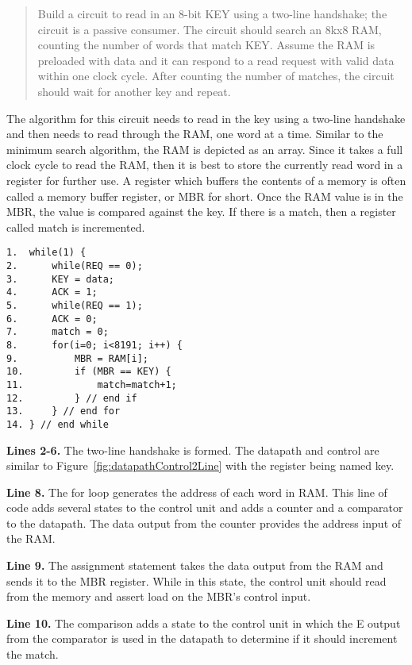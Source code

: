 \begin{quote}
Build a circuit to read in an 8-bit KEY using a 
two-line handshake; the circuit is a passive consumer.
The circuit should search an 8kx8 RAM, counting the number
of words that match KEY.  Assume the RAM is
preloaded with data and it can respond to a read
request with valid data within one clock cycle.  After 
counting the number of matches, the circuit should wait 
for another key and repeat.
\end{quote}

The algorithm for this circuit needs to read in the key using
a two-line handshake and then needs to read through the RAM, one word
at a time.  Similar to the minimum search algorithm, the
RAM is depicted as an array.  Since it takes a full 
clock cycle to read the
RAM, then it is best to store the currently read word in a 
register for further use.  A register which buffers the contents
of a memory is often called a memory buffer register, or MBR
for short.  Once the RAM value is in the MBR, the value is compared
against the key.  If there is a match, then a register called
match is incremented.

\begin{verbatim}
1.  while(1) {
2.      while(REQ == 0);
3.      KEY = data;
4.      ACK = 1;
5.      while(REQ == 1);
6.      ACK = 0;
7.      match = 0;
8.      for(i=0; i<8191; i++) {
9.          MBR = RAM[i]; 
10.         if (MBR == KEY) {
11.             match=match+1;
12.         } // end if
13.     } // end for 
14. } // end while
\end{verbatim}

\textbf{ Lines 2-6.} The two-line handshake is formed.  The datapath and control
are similar to Figure~\ref{fig:datapathControl2Line} with the register being 
named key.

\textbf{ Line 8.} The for loop generates the address of each word in RAM.  
This line of code adds several states to the control unit and adds
a counter and a comparator to the datapath.  The data output from
the counter provides the address input of the RAM.

\textbf{ Line 9.} The assignment statement takes the data output from the
RAM and sends it to the MBR register.  While in this state, the 
control unit should read from the memory and assert load on the
MBR's control input.

\textbf{ Line 10.}  The comparison adds a state to the control unit
in which the E output from the comparator is used in the 
datapath to determine if it should increment the match.

